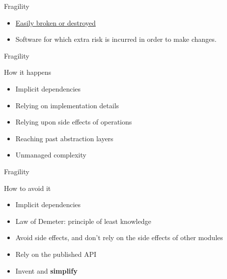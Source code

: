 \documentclass[xcolor=svgnames, handout]{beamer}
\begin{document}
{%
%
\begin{frame}{Fragility}

    \begin{itemize}
        \item \href{https://www.merriam-webster.com/dictionary/fragile}
            {Easily broken or destroyed}
        \item<2-> Software for which extra risk is incurred in order to make
            changes.
    \end{itemize}
\end{frame}
}


{%
%
\begin{frame}{Fragility}

    How it happens
    \begin{itemize}
        \item<1-> Implicit dependencies
        \item<2-> Relying on implementation details
        \item<3-> Relying upon side effects of operations
        \item<4-> Reaching past abstraction layers
        \item<5-> Unmanaged complexity
    \end{itemize}
\end{frame}
}


{%
%
\begin{frame}{Fragility}

    How to avoid it
    \begin{itemize}
        \item<1-> Implicit dependencies
        \item<2-> Law of Demeter: principle of least knowledge
        \item<3-> Avoid side effects, and don't rely on the side effects of
            other modules
        \item<4-> Rely on the published API
        \item<5-> Invent and \textbf{simplify}
    \end{itemize}
\end{frame}
}
\end{document}

